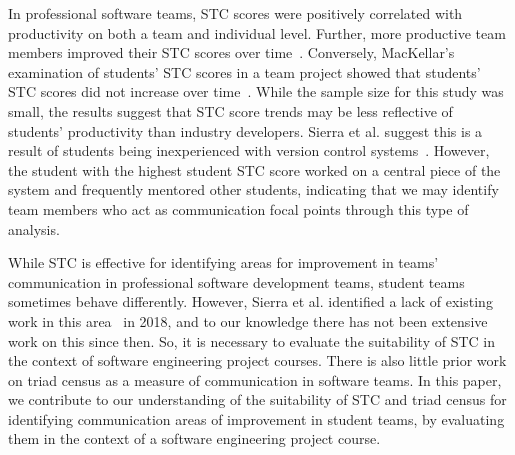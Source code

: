 In professional software teams, STC scores were positively correlated with productivity on both a team and individual level. Further, more productive team members  improved their STC scores over time~\cite{cataldoIdentificationCoordinationRequirements2006}. Conversely, MacKellar's examination of students' STC scores in a team project showed that students' STC scores did not increase over time~\cite{b.k.mackellarAnalyzingCoordinationStudents2013}. While the sample size for this study was small, the results suggest that STC score trends may be less reflective of students' productivity than industry developers. Sierra et al. suggest this is a result of students being inexperienced with version control systems~\cite{sierraSystematicMappingStudy2018}. However, the student with the highest student STC score worked on a central piece of the system and frequently mentored other students, indicating that we may identify team members who act as communication focal points through this type of analysis.



While STC is effective for identifying areas for improvement in teams' communication in professional software development teams, student teams sometimes behave differently. However, Sierra et al. identified a lack of existing work in this area~\cite{sierraSystematicMappingStudy2018} in 2018, and to our knowledge there has not been extensive work on this since then. So, it is necessary to evaluate the suitability of STC in the context of software engineering project courses. There is also little prior work on triad census as a measure of communication in software teams. In this paper, we contribute to our understanding of the suitability of STC and triad census for identifying communication areas of improvement in student teams, by evaluating them in the context of a software engineering project course.


